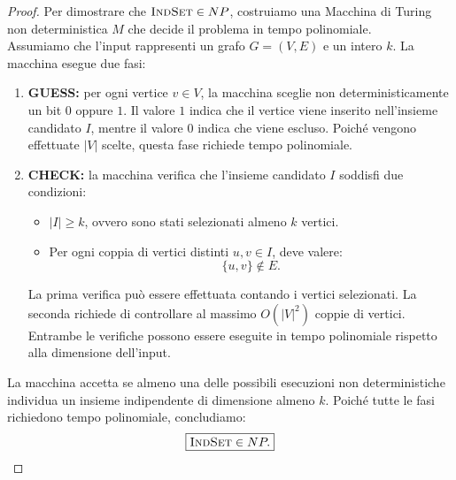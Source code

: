 \begin{proof}
    Per dimostrare che $\textsc{IndSet}\in NP$, costruiamo una
Macchina di Turing non deterministica $M$ che
decide il problema in tempo polinomiale.\\
Assumiamo che l'input rappresenti un grafo
$G=(V,E)$ e un intero $k$.
La macchina esegue due fasi:

\begin{enumerate}
    \item \textbf{GUESS:} per ogni vertice
    $v\in V$, la macchina sceglie
    non deterministicamente un bit
    $0$ oppure $1$.
    Il valore $1$ indica che il vertice
    viene inserito nell'insieme candidato
    $I$, mentre il valore $0$ indica
    che viene escluso.
    Poiché vengono effettuate $|V|$ scelte,
    questa fase richiede tempo polinomiale.

    \item \textbf{CHECK:} la macchina verifica
    che l'insieme candidato $I$ soddisfi
    due condizioni:
    \begin{itemize}
        \item $|I|\geq k$, ovvero sono stati
        selezionati almeno $k$ vertici.

        \item Per ogni coppia di vertici distinti
        $u,v\in I$, deve valere:
        \[
        \{u,v\}\notin E.
        \]
    \end{itemize}
    \noindent La prima verifica può essere effettuata
    contando i vertici selezionati.
    La seconda richiede di controllare
    al massimo $O(|V|^2)$ coppie di vertici.
    Entrambe le verifiche possono essere
    eseguite in tempo polinomiale rispetto
    alla dimensione dell'input.
\end{enumerate}
La macchina accetta se almeno una delle
possibili esecuzioni non deterministiche
individua un insieme indipendente
di dimensione almeno $k$.
Poiché tutte le fasi richiedono tempo
polinomiale, concludiamo:
\[
\boxed{\textsc{IndSet}\in NP.}
\]
\end{proof}


